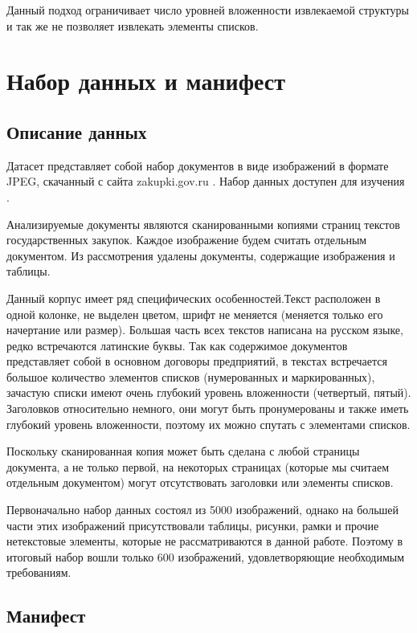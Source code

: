 \documentclass{ProcISPRAS}
\begin{document}
Данный подход ограничивает число уровней вложенности извлекаемой структуры и так же не позволяет извлекать элементы списков.

\section{Набор данных и манифест}

\subsection{Описание данных}

Датасет представляет собой набор документов в виде изображений в формате JPEG, скачанный с сайта zakupki.gov.ru \cite{zakupki}. Набор данных доступен для изучения \cite{data}. 

Анализируемые документы являются сканированными копиями страниц текстов государственных закупок. Каждое изображение будем считать отдельным документом. Из рассмотрения удалены документы, содержащие изображения и таблицы.

Данный корпус имеет ряд специфических особенностей.Текст расположен в одной колонке, не выделен цветом, шрифт не меняется (меняется только его начертание или размер). Большая часть всех текстов написана на русском языке, редко встречаются латинские буквы. Так как содержимое документов представляет собой в основном договоры предприятий, в текстах встречается большое количество элементов списков (нумерованных и маркированных), зачастую списки имеют очень глубокий уровень вложенности (четвертый, пятый). Заголовков относительно немного, они могут быть пронумерованы и также иметь глубокий уровень вложенности, поэтому их можно спутать с элементами списков.

Поскольку сканированная копия может быть сделана с любой страницы документа, а не только первой, на некоторых страницах (которые мы считаем отдельным документом) могут отсутствовать заголовки или элементы списков.

Первоначально набор данных состоял из 5000 изображений, однако на большей части этих изображений присутствовали таблицы, рисунки, рамки и прочие нетекстовые элементы, которые не рассматриваются в данной работе. Поэтому в итоговый набор вошли только 600 изображений, удовлетворяющие необходимым требованиям.

\subsection{Манифест}
\end{document}
